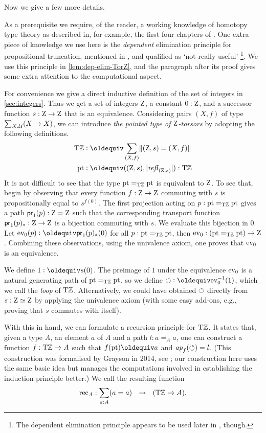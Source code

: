 \documentclass[a4paper,12pt]{amsart}
\begin{document}
Now we give a few more details.

As a prerequisite we require, of the reader, a working knowledge of homotopy type theory
as described in, for example, the first four chapters of \cite{hottbook}.
One extra piece of knowledge we use here is the \emph{dependent} elimination
principle for propositional truncation, mentioned in \cite[Ch. 6.9]{hottbook},
and qualified as `not really useful'%
\footnote{The dependent elimination principle appears to 
  be used later in \cite{hottbook}, though.
}.
We use this principle in \cref{lem:dep-elim-TorZ}, and the paragraph after
its proof gives some extra attention to the computational aspect.

For convenience we give a direct inductive
definition of the set of integers in \cref{sec:integers}.
Thus we get a set of integers $\mathrm{Z}$, a constant $0:\mathrm{Z}$,
and a successor function $s:\mathrm{Z}\to\mathrm{Z}$
that is an equivalence.
Considering pairs $(X,f)$ of type $\sum_{X:\mathcal{U}}(X\to X)$,
we can introduce \emph{the 
pointed type of $\mathrm{Z}$-torsors} by adopting the following definitions.
\begin{align*}
  \TorZ &\defeq \sum_{(X,f)}\Trunc{(\zet,s)=(X,f)}  \\
  \pt & \defeq ((\zet,s),\trunc{\refl{(\zet,s)}}) : \TorZ
\end{align*}
It is not difficult to see 
that the type ${\mathord{\mathrm{pt}}} =_{\mathrm{T}\mathbb{Z}} {\mathord{\mathrm{pt}}}$ is equivalent to $\mathrm{Z}$.  To see that,
begin by observing that every function $f:\mathrm{Z}\to\mathrm{Z}$ commuting with $s$
is propositionally equal to $s^{f(0)}$.  The first projection
acting on $p : {\mathord{\mathrm{pt}}} =_{\mathrm{T}\mathbb{Z}} {\mathord{\mathrm{pt}}}$ gives a path $\mathsf{pr}_1(p) : \mathrm{Z}=\mathrm{Z}$
such that the corresponding transport function $\mathsf{pr}_1(p)_* : \mathrm{Z}\to\mathrm{Z}$
is a bijection commuting with $s$. We evaluate this bijection in $0$.
Let $\ev_0(p) \defeq \mathsf{pr}_1(p)_*(0)$ for all $p : {\mathord{\mathrm{pt}}} =_{\mathrm{T}\mathbb{Z}} {\mathord{\mathrm{pt}}}$,
then $\mathrm{ev}_0 : ({\mathord{\mathrm{pt}}} =_{\mathrm{T}\mathbb{Z}} {\mathord{\mathrm{pt}}}) \to \mathrm{Z}$.  Combining these observations,
using the univalence axiom, one proves that $\mathrm{ev}_0$ is an equivalence.

We define $1 \defeq s(0)$.
The preimage of $1$ under the equivalence $\mathrm{ev}_0$ is a
natural generating path of ${\mathord{\mathrm{pt}}} =_{\mathrm{T}\mathbb{Z}} {\mathord{\mathrm{pt}}}$, so we define
${\Zloop}\defeq \ev_0^{-1}(1)$, which we call the \emph{loop}
of ${\mathrm{T}\mathbb{Z}}$. Alternatively, we could have obtained $\circlearrowleft$
directly from $s: \mathrm{Z}\simeq\mathrm{Z}$ by applying the univalence axiom
(with some easy add-ons, e.g., proving that $s$ commutes with itself).

With this in hand, we can formulate a recursion principle for ${\mathrm{T}\mathbb{Z}}$.
It states that, given a type $A$, an element $a$ of $A$ and a
path $l:a=_A a$, one can construct a function $f:{\mathrm{T}\mathbb{Z}}\to A$
such that $f(\pt)\jdeq a$ and $\mathop{{\it ap}_{f}}(\circlearrowleft)=l$.
(This construction was formalised by Grayson 
in 2014, see \cite{circlerec-Dan}; our construction here uses the 
same basic idea but manages the computations involved in establishing the
induction principle better.)  We call the resulting function
\[
{\mathop{\mathrm{rec}}}_A : \sum_{a:A}(a=a) ~~\to~~ ({\mathrm{T}\mathbb{Z}} \to A).
\]
\end{document}
